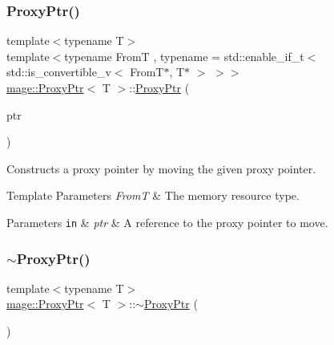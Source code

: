\subsubsection{\texorpdfstring{Proxy\+Ptr()}{ProxyPtr()}\hspace{0.1cm}{\footnotesize\ttfamily [8/8]}}
{\footnotesize\ttfamily template$<$typename T$>$ \\
template$<$typename FromT , typename  = std\+::enable\+\_\+if\+\_\+t$<$ std\+::is\+\_\+convertible\+\_\+v$<$ From\+T$\ast$, T$\ast$ $>$ $>$$>$ \\
\mbox{\hyperlink{classmage_1_1_proxy_ptr}{mage\+::\+Proxy\+Ptr}}$<$ T $>$\+::\mbox{\hyperlink{classmage_1_1_proxy_ptr}{Proxy\+Ptr}} (\begin{DoxyParamCaption}\item[{\mbox{\hyperlink{classmage_1_1_proxy_ptr}{Proxy\+Ptr}}$<$ FromT $>$ \&\&}]{ptr }\end{DoxyParamCaption})\hspace{0.3cm}{\ttfamily [noexcept]}}

Constructs a proxy pointer by moving the given proxy pointer.


\begin{DoxyTemplParams}{Template Parameters}
{\em FromT} & The memory resource type. \\
\hline
\end{DoxyTemplParams}

\begin{DoxyParams}[1]{Parameters}
\mbox{\tt in}  & {\em ptr} & A reference to the proxy pointer to move. \\
\hline
\end{DoxyParams}
\mbox{\label{classmage_1_1_proxy_ptr_a7f8989f9214bbc1cd94295c796cfbb9a}} 
\subsubsection{\texorpdfstring{$\sim$\+Proxy\+Ptr()}{~ProxyPtr()}}
{\footnotesize\ttfamily template$<$typename T$>$ \\
\mbox{\hyperlink{classmage_1_1_proxy_ptr}{mage\+::\+Proxy\+Ptr}}$<$ T $>$\+::$\sim$\mbox{\hyperlink{classmage_1_1_proxy_ptr}{Proxy\+Ptr}} (\begin{DoxyParamCaption}{ }\end{DoxyParamCaption})\hspace{0.3cm}{\ttfamily [default]}}

